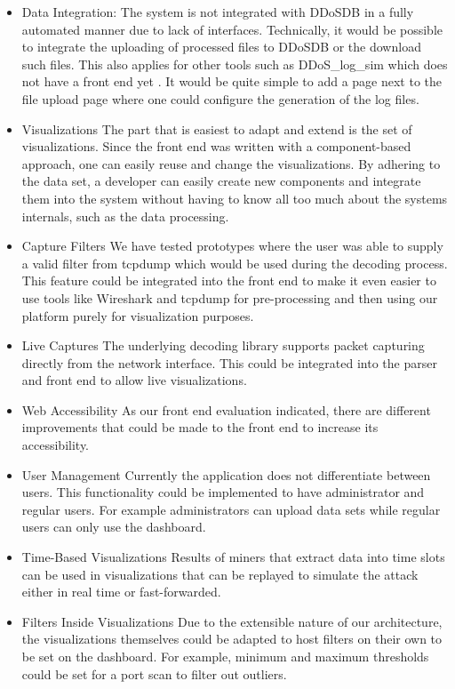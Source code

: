 \begin{itemize}
    \item Data Integration:
    The system is not integrated with DDoSDB in a fully automated manner due to lack of interfaces. Technically, it would be possible to integrate the uploading  of processed files to DDoSDB or the download such files.
    This also applies for other tools such as DDoS\_log\_sim which does not have a front end yet \cite{ddoslogsim}. It would be quite simple to add a page next to the file upload page where one could configure the generation of the log files.
    
    \item Visualizations
    The part that is easiest to adapt and extend is the set of visualizations. Since the front end was written with a component-based approach, one can easily reuse and change the visualizations. By adhering to the data set, a developer can easily create new components and integrate them into the system without having to know all too much about the systems internals, such as the data processing.
    
    \item Capture Filters
    We have tested prototypes where the user was able to supply a valid filter from tcpdump which would be used during the decoding process. This feature could be integrated into the front end to make it even easier to use tools like Wireshark and tcpdump for pre-processing and then using our platform purely for visualization purposes.
    
    \item Live Captures
    The underlying decoding library supports packet capturing directly from the network interface. This could be integrated into the parser and front end to allow live visualizations.
    
    \item Web Accessibility
    As our front end evaluation indicated, there are different improvements that could be made to the front end to increase its accessibility.
    
    \item User Management
    Currently the application does not differentiate between users. This functionality could be implemented to have administrator and regular users. For example administrators can upload data sets while regular users can only use the dashboard.
    
    \item Time-Based Visualizations
    Results of miners that extract data into time slots can be used in visualizations that can be replayed to simulate the attack either in real time or fast-forwarded.
    
    \item Filters Inside Visualizations
    Due to the extensible nature of our architecture, the visualizations themselves could be adapted to host filters on their own to be set on the dashboard. For example, minimum and maximum thresholds could be set for a port scan to filter out outliers.
    
\end{itemize}
